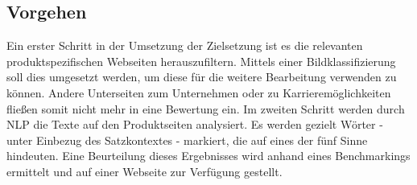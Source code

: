 \subsection{Vorgehen}
Ein erster Schritt in der Umsetzung der Zielsetzung ist es die relevanten produktspezifischen Webseiten herauszufiltern. Mittels einer Bildklassifizierung soll dies umgesetzt werden, um diese für die weitere Bearbeitung verwenden zu können.
Andere Unterseiten zum Unternehmen oder zu Karrieremöglichkeiten fließen somit nicht mehr in eine Bewertung ein. Im zweiten Schritt werden durch \acf{NLP} die Texte auf den Produktseiten analysiert. Es werden gezielt Wörter - unter Einbezug des Satzkontextes - markiert, die auf eines der fünf Sinne hindeuten.
Eine Beurteilung dieses Ergebnisses wird anhand eines Benchmarkings ermittelt und auf einer Webseite zur Verfügung gestellt.

